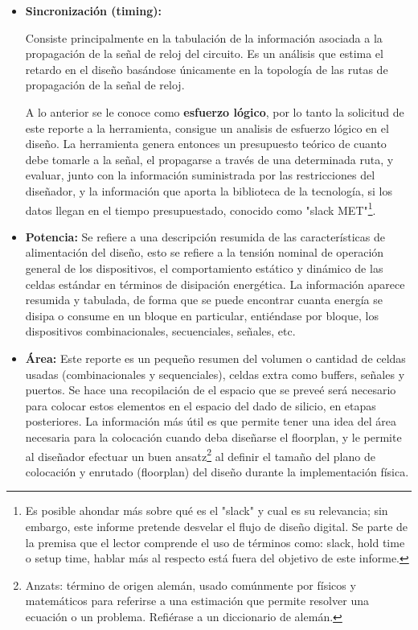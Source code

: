 \begin{itemize}
\item \textbf{Sincronización (timing):} {Consiste principalmente en la tabulación de la información asociada a la propagación de la señal de reloj del circuito. Es un análisis que estima el retardo en el diseño basándose únicamente en la topología de las rutas de propagación de la señal de reloj.

A lo anterior se le conoce como \textbf{esfuerzo lógico}, por lo tanto la solicitud de este reporte a la herramienta, consigue un analisis de esfuerzo lógico en el diseño. La herramienta genera entonces un presupuesto teórico de cuanto debe tomarle a la señal, el propagarse a través de una determinada ruta, y evaluar, junto con la información suministrada por las restricciones del diseñador, y la información que aporta la biblioteca de la tecnología, si los datos llegan en el tiempo presupuestado, conocido como "slack MET"\footnote{Es posible ahondar más sobre qué es el "slack" y cual es su relevancia; sin embargo, este informe pretende desvelar el flujo de diseño digital. Se parte de la premisa que el lector comprende el uso de términos como: slack, hold time o setup time, hablar más al respecto está fuera del objetivo de este informe.}.}

\item \textbf{Potencia:} {Se refiere a una descripción resumida de las características de alimentación del diseño, esto se refiere a la tensión nominal de operación general de los dispositivos, el comportamiento estático y dinámico de las celdas estándar en términos de disipación energética. La información aparece resumida y tabulada, de forma que se puede encontrar cuanta energía se disipa o consume en un bloque en particular, entiéndase por bloque, los dispositivos combinacionales, secuenciales, señales, etc. }

\item \textbf{Área:} {Este reporte es un pequeño resumen del volumen o cantidad de celdas usadas (combinacionales y sequenciales), celdas extra como buffers, señales y puertos. Se hace una recopilación de el espacio que se preveé será necesario para colocar estos elementos en el espacio del dado de silicio, en etapas posteriores. La información más útil es que permite tener una idea del área necesaria para la colocación cuando deba diseñarse el floorplan, y le permite al diseñador efectuar un buen ansatz\footnote{Anzats: término de origen alemán, usado comúnmente por físicos y matemáticos para referirse a una estimación que permite resolver una ecuación o un problema. Refiérase a un diccionario de alemán.} al definir el tamaño del plano de colocación y enrutado (floorplan) del diseño durante la implementación física.}


\end{itemize}
